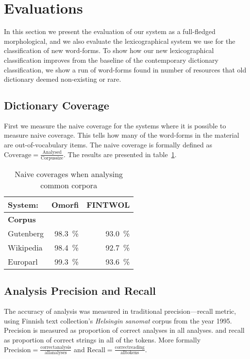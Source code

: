 \documentclass[a4paper,12pt]{article}
\begin{document}
\section{Evaluations}

In this section we present the evaluation of our system as a full-fledged
morphological, and we also evaluate the lexicographical system we use for
the classification of new word-forms. To show how our new lexicographical
classification improves from the baseline of the contemporary dictionary
classification, we show a run of word-forms found in number of resources that
old dictionary deemed non-existing or rare.

\subsection{Dictionary Coverage}

First we measure the naive coverage for the systems where it is possible to
measure naive coverage. This tells how many of the word-forms in the material
are out-of-vocabulary items. The naive coverage is formally defined as
$\mathrm{Coverage} = \frac{\mathrm{Analysed}}{\mathrm{Corpus size}}$. The
results are presented in table~\ref{table:coverage}. 

\begin{table}
    \centering
    \begin{tabular}{|l|r|r|}
        \hline
        \bf System: & Omorfi & FINTWOL \\
        \hline
        \bf Corpus & & \\
        \hline
        Gutenberg & 98.3~\% & 93.0~\%   \\
        Wikipedia & 98.4~\% & 92.7~\% \\
        Europarl  & 99.3~\% & 93.6~\% \\
        \hline
    \end{tabular}
    \caption{Naive coverages when analysing common corpora
    \label{table:coverage}}
\end{table}

\subsection{Analysis Precision and Recall}

The accuracy of analysis was measured in traditional precision---recall metric,
using Finnish text collection's \emph{Helsingin sanomat} corpus from the year
1995. Precision is measured as proportion of correct analyses in all analyses.
and recall as proportion of correct strings in all of the tokens. More formally
$\mathrm{Precision} = \frac{\mathrm{correct analysis}}{\mathrm{all analyses}}$
and $\mathrm{Recall} = \frac{\mathrm{correct reading}}{\mathrm{all tokens}}$.
\end{document}
